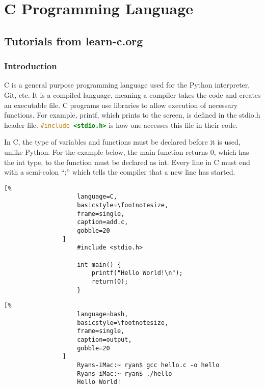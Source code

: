 \documentclass[crop=false,class=book]{standalone}
\begin{document}
\chapter{C Programming Language}
    \section{Tutorials from learn-c.org}
        \subsection{Introduction}
            C is a general purpose programming language used for the
            Python interpreter, Git, etc. It is a compiled language,
            meaning a compiler takes the code and creates an
            executable file. C programs use libraries to allow
            execution of necessary functions. For example, printf,
            which prints to the screen, is defined in the stdio.h
            header file.
            \lstinline[language=C]{#include <stdio.h>}
            is how one accesses this
            file in their code.\par\hfill\par
            In C, the type of variables and functions must be
            declared before it is used, unlike Python. For the
            example below, the main function returns 0, which has
            the int type, to the function must be declared as int.
            Every line in C must end with a semi-colon ``;''
            which tells the compiler that a new line has started.
            \newline
            \begin{minipage}[t]{.48\textwidth}
                \centering
                \begin{lstlisting}[%
                    language=C,
                    basicstyle=\footnotesize,
                    frame=single,
                    caption=add.c,
                    gobble=20
                ]
                    #include <stdio.h>
                    
                    int main() {
                        printf("Hello World!\n");
                        return(0);
                    }
                \end{lstlisting}
            \end{minipage}\hfill
            \begin{minipage}[t]{.48\textwidth}
                \centering
                \begin{lstlisting}[%
                    language=bash,
                    basicstyle=\footnotesize,
                    frame=single,
                    caption=output,
                    gobble=20
                ]
                    Ryans-iMac:~ ryan$ gcc hello.c -o hello
                    Ryans-iMac:~ ryan$ ./hello
                    Hello World!
                \end{lstlisting}
            \end{minipage}
\end{document}
